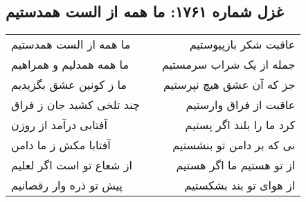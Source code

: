 \begin{center}
\section*{غزل شماره ۱۷۶۱: ما همه از الست همدستیم}
\label{sec:1761}
\begin{longtable}{l p{0.5cm} r}
ما همه از الست همدستیم
&&
عاقبت شکر بازپیوستیم
\\
ما همه همدلیم و همراهیم
&&
جمله از یک شراب سرمستیم
\\
ما ز کونین عشق بگزیدیم
&&
جز که آن عشق هیچ نپرستیم
\\
چند تلخی کشید جان ز فراق
&&
عاقبت از فراق وارستیم
\\
آفتابی درآمد از روزن
&&
کرد ما را بلند اگر پستیم
\\
آفتابا مکش ز ما دامن
&&
نی که بر دامن تو بنشستیم
\\
از شعاع تو است اگر لعلیم
&&
از تو هستیم ما اگر هستیم
\\
پیش تو ذره وار رقصانیم
&&
از هوای تو بند بشکستیم
\\
\end{longtable}
\end{center}
